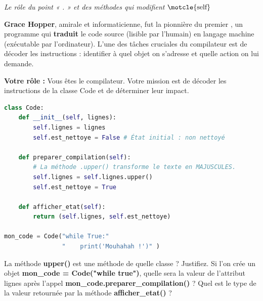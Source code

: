 \newpage
\begin{Exercise}[title=L'Interprétation de Grace Hopper (Années 1950)]
\begin{center}
    \textit{Le rôle du point « . » et des méthodes qui modifient $\text{\motcle{self}}$}
\end{center}

\textbf{Grace Hopper},  amirale et informaticienne, fut la pionnière du premier , un programme qui \textbf{traduit} le code source (lisible par l'humain) en langage machine (exécutable par l'ordinateur). L'une des tâches cruciales du compilateur est de décoder les instructions : identifier à quel objet on s'adresse et quelle action on lui demande.

\textbf{Votre rôle :} Vous êtes le compilateur. Votre mission est de décoder les instructions de la classe Code et de déterminer leur impact.

\begin{lstlisting}[language=Python]
class Code:
    def __init__(self, lignes):
        self.lignes = lignes
        self.est_nettoye = False # État initial : non nettoyé

    def preparer_compilation(self):
        # La méthode .upper() transforme le texte en MAJUSCULES.
        self.lignes = self.lignes.upper() 
        self.est_nettoye = True

    def afficher_etat(self):
        return (self.lignes, self.est_nettoye)

mon_code = Code("while True:"
                "    print('Mouhahah !')" )
\end{lstlisting}

\Question La méthode \textbf{upper()} est une méthode de quelle classe ? Justifiez.
\Question Si l'on crée un objet \textbf{mon\_code = Code("while true")}, quelle sera la valeur de l'attribut lignes après l'appel \textbf{mon\_code.preparer\_compilation()} ?
\Question Quel est le type de la valeur retournée par la méthode \textbf{afficher\_etat()} ?
\end{Exercise}

